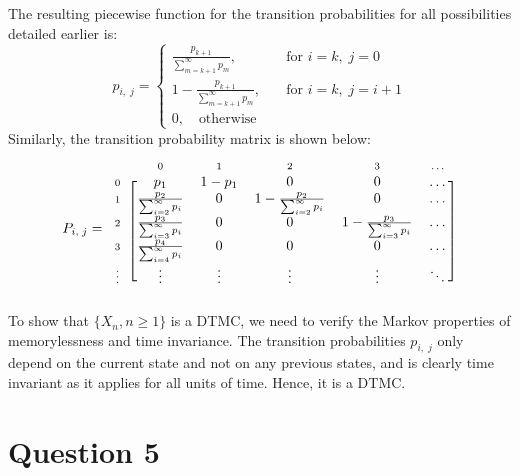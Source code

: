 \documentclass[12pt]{article}
\newcommand{\matindex}[1]{\mbox{\scriptsize#1}}%
\begin{document}
\noindent The resulting piecewise function for the transition probabilities for all possibilities detailed earlier is: \begin{equation}
    p_{i, \;j} = \begin{cases}
        \displaystyle\frac{p_{k+1}}{ \sum_{m=k+1}^{\infty} p_m}, \quad & \text{for } i = k, \; j = 0 \\ 
         1 - \displaystyle\frac{p_{k+1}}{ \sum_{m=k+1}^{\infty} p_m}, \quad & \text{for } i = k, \; j = i + 1 \\ 
         0, \quad \text{otherwise}
    \end{cases}
\end{equation} Similarly, the transition probability matrix is shown below: \begin{equation}
        P_{i, \; j} = \begin{blockarray}{cccccc}
                & \matindex{0} & \matindex{1} & \matindex{2} &\matindex{3} &\matindex{\dots} \\ 
            \begin{block}{c[ccccc]}
                \matindex{0} & p_{1} & 1-p_{1} & 0 & 0 & \dots \\ 
                \matindex{1} & \frac{p_{2}}{ \sum_{i=2}^{\infty} p_i} & 0 & 1-\frac{p_{2}}{ \sum_{i=2}^{\infty} p_i} & 0 & \dots \\ 
                \matindex{2} & \frac{p_{3}}{ \sum_{i=3}^{\infty} p_i} & 0 & 0 & 1-\frac{p_{3}}{ \sum_{i=3}^{\infty} p_i} & \dots \\ 
                \matindex{3} & \frac{p_{4}}{ \sum_{i=4}^{\infty} p_i} & 0 & 0 & 0 & \dots \\ 
                \matindex{\vdots} & \vdots & \vdots & \vdots & \vdots & \ddots \\
            \end{block}
        \end{blockarray}
\end{equation} To show that $\{X_n, n\geq 1\}$ is a DTMC, we need to verify the Markov properties of memorylessness and time invariance. The transition probabilities $p_{i, \; j}$ only depend on the current state and not on any previous states, and is clearly time invariant as it applies for all units of time. Hence, it is a DTMC. 

\section*{Question 5}
\end{document}
